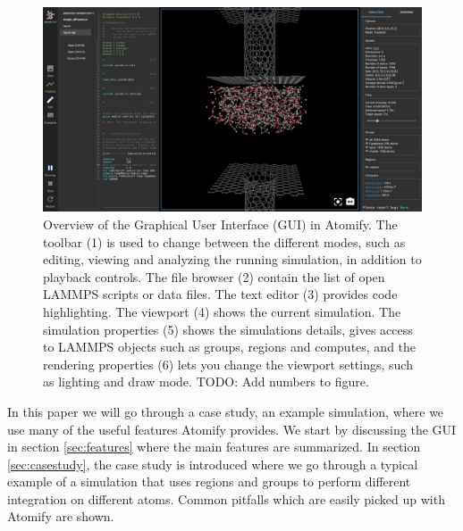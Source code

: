 \documentclass[12pt,a4paper,final]{iopart}
\begin{document}
\begin{figure}
	\centering
	\includegraphics[width=\textwidth]{gui.png}
	\caption{%
    Overview of the Graphical User Interface (GUI) in Atomify.
    The toolbar (1) is used to change between the different modes, such as
    editing, viewing and analyzing the running simulation,
    in addition to playback controls.
    The file browser (2) contain the list of open LAMMPS scripts or data files.
    The text editor (3) provides code highlighting.
    The viewport (4) shows the current simulation.
    The simulation properties (5) shows the simulations details, gives access to
    LAMMPS objects such as groups, regions and computes, and the rendering
    properties (6) lets you change the viewport settings, such as lighting and
    draw mode.
    TODO: Add numbers to figure.
    }
	\label{fig:gui}
\end{figure}

In this paper we will go through a case study, an example simulation, where we
use many of the useful features Atomify provides.
We start by discussing the GUI in section \ref{sec:features} where the main features are summarized.
In section \ref{sec:casestudy}, the case study is introduced where we go through a typical example
of a simulation that uses regions and groups to perform different integration on different atoms.
Common pitfalls which are easily picked up with Atomify are shown.
\end{document}
